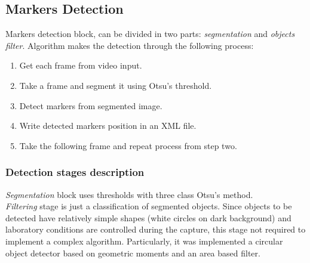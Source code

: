 \subsection{Markers Detection}
Markers detection block, can be divided in two parts: \textit{segmentation} and \textit{objects filter}.
%
Algorithm makes the detection through the following process:
%
\begin{enumerate}
  \item Get each frame from video input.
  \item Take a frame and segment it using Otsu's threshold.
  \item Detect markers from segmented image.
  \item Write detected markers position in an XML file.
  \item Take the following frame and repeat process from step two.
\end{enumerate}
%
\subsubsection{Detection stages description}
\textit{Segmentation} block uses thresholds with three class Otsu's method\cite{otsu}.\\
%
\textit{Filtering} stage is just a classification of segmented objects. Since objects to be detected have relatively simple shapes (white circles on dark background) and laboratory conditions are controlled during the capture, this stage not required to implement a complex algorithm. Particularly, it was implemented a circular object detector based on geometric moments\cite{imageMoments} and an area based filter.
%
